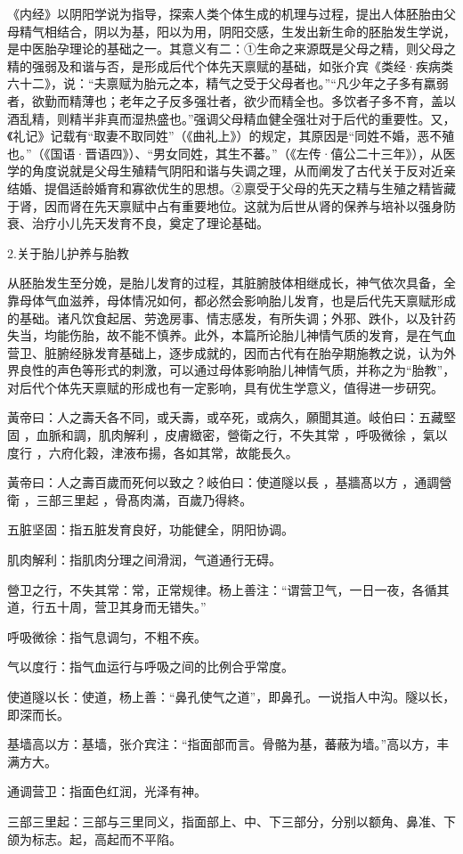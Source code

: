 \documentclass[draft,12pt]{ctexbook}
\begin{document}
《内经》以阴阳学说为指导，探索人类个体生成的机理与过程，提出人体胚胎由父母精气相结合，阴以为基，阳以为用，阴阳交感，生发出新生命的胚胎发生学说，是中医胎孕理论的基础之一。其意义有二：①生命之来源既是父母之精，则父母之精的强弱及和谐与否，是形成后代个体先天禀赋的基础，如张介宾《类经·疾病类六十二》，说：“夫禀赋为胎元之本，精气之受于父母者也。”“凡少年之子多有羸弱者，欲勤而精薄也；老年之子反多强壮者，欲少而精全也。多饮者子多不育，盖以酒乱精，则精半非真而湿热盛也。”强调父母精血健全强壮对于后代的重要性。又，《礼记》记载有“取妻不取同姓”（《曲礼上》）的规定，其原因是“同姓不婚，恶不殖也。”（《国语·晋语四》）、“男女同姓，其生不蕃。”（《左传·僖公二十三年》），从医学的角度说就是父母生殖精气阴阳和谐与失调之理，从而阐发了古代关于反对近亲结婚、提倡适龄婚育和寡欲优生的思想。②禀受于父母的先天之精与生殖之精皆藏于肾，因而肾在先天禀赋中占有重要地位。这就为后世从肾的保养与培补以强身防衰、治疗小儿先天发育不良，奠定了理论基础。

2.关于胎儿护养与胎教

从胚胎发生至分娩，是胎儿发育的过程，其脏腑肢体相继成长，神气依次具备，全靠母体气血滋养，母体情况如何，都必然会影响胎儿发育，也是后代先天禀赋形成的基础。诸凡饮食起居、劳逸房事、情志感发，有所失调；外邪、跌仆，以及针药失当，均能伤胎，故不能不慎养。此外，本篇所论胎儿神情气质的发育，是在气血营卫、脏腑经脉发育基础上，逐步成就的，因而古代有在胎孕期施教之说，认为外界良性的声色等形式的刺激，可以通过母体影响胎儿神情气质，并称之为“胎教”，对后代个体先天禀赋的形成也有一定影响，具有优生学意义，值得进一步研究。


\begin{yuanwen}
黃帝曰：人之壽夭各不同，或夭壽，或卒死，或病久，願聞其道。岐伯曰：五藏堅固 ，血脈和調，肌肉解利 ，皮膚緻密，營衛之行，不失其常 ，呼吸微徐 ，氣以度行 ，六府化榖，津液布揚，各如其常，故能長久。

黃帝曰：人之壽百歲而死何以致之？岐伯曰：使道隧以長 ，基牆髙以方 ，通調營衛 ，三部三里起 ，骨髙肉滿，百歲乃得終。
\end{yuanwen}


\begin{jiaozhu}
  \item 五脏坚固：指五脏发育良好，功能健全，阴阳协调。
  \item 肌肉解利：指肌肉分理之间滑润，气道通行无碍。
  \item 營卫之行，不失其常：常，正常规律。杨上善注：“谓营卫气，一日一夜，各循其道，行五十周，营卫其身而无错失。”
  \item 呼吸微徐：指气息调匀，不粗不疾。
  \item 气以度行：指气血运行与呼吸之间的比例合乎常度。
  \item 使道隧以长：使道，杨上善：“鼻孔使气之道”，即鼻孔。一说指人中沟。隧以长，即深而长。
  \item 基墙高以方：基墙，张介宾注：“指面部而言。骨骼为基，蕃蔽为墙。”高以方，丰满方大。
  \item 通调营卫：指面色红润，光泽有神。
  \item 三部三里起：三部与三里同义，指面部上、中、下三部分，分别以额角、鼻准、下颌为标志。起，高起而不平陷。
\end{jiaozhu}
\end{document}
